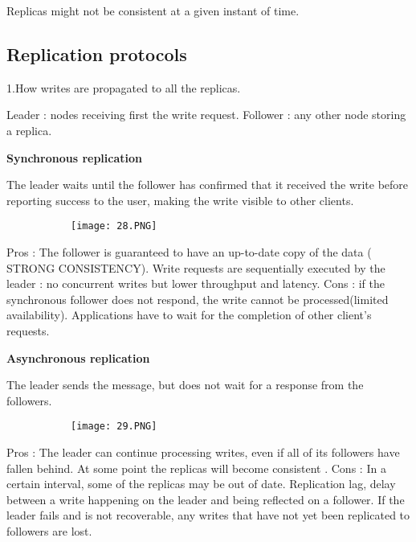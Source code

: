 \documentclass{article}
\begin{document}
Replicas might not be consistent at a given instant of time.


\subsection{Replication protocols}

1.How writes are propagated to all the replicas. 

Leader : nodes receiving first the write request.
Follower : any other node storing a replica.

\vspace{2mm}
\textbf{Synchronous replication}

The leader waits until the follower has confirmed that it received the write before reporting success to the user, making the write visible to other clients.

\begin{figure}[ht!]
  \centering
  \begin{subfigure}[b]{0.35\linewidth}
    \texttt{[image: 28.PNG]}
  \end{subfigure}
\end{figure}


Pros : The follower is guaranteed to have an up-to-date copy of the data ( STRONG CONSISTENCY). Write requests are sequentially executed by the leader : no concurrent writes but lower throughput and latency.
Cons : if the synchronous follower does not respond, the write cannot be processed(limited availability). Applications have to wait for the completion of other client's requests.


\vspace{2mm}
\textbf{Asynchronous replication}

The leader sends the message, but does not wait for a response from the followers.

\begin{figure}[ht!]
  \centering
  \begin{subfigure}[b]{0.35\linewidth}
    \texttt{[image: 29.PNG]}
  \end{subfigure}
\end{figure}

Pros : The leader can continue processing writes, even if all of its followers have fallen behind. At some point the replicas will become consistent .
Cons : In a certain interval, some of the replicas may be out of date. Replication lag, delay between a write happening on the leader and being reflected on a follower. If the leader fails and is not recoverable, any writes that have not yet been replicated to followers are lost.
\end{document}
